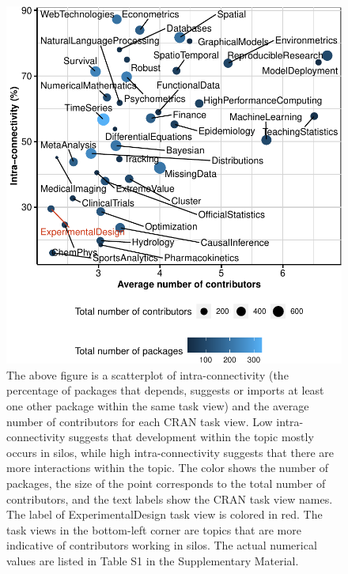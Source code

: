 \begin{figure}[htbp]

{\centering \includegraphics{figures/ctv-summ-plot-1} 

}

\caption{The above figure is a scatterplot of intra-connectivity (the percentage of packages that depends, suggests or imports at least one other package within the same task view) and the average number of contributors for each CRAN task view. Low intra-connectivity suggests that development within the topic mostly occurs in silos, while high  intra-connectivity suggests that there are more interactions within the topic. The color shows the number of packages, the size of the point corresponds to the total number of contributors, and the text labels show the CRAN task view names.  The label of ExperimentalDesign task view is colored in red. The task views in the bottom-left corner are topics that are more indicative of contributors working in silos. The actual numerical values are listed in Table S1 in the Supplementary Material.}\label{fig:ctv-summ-plot}
\end{figure}

